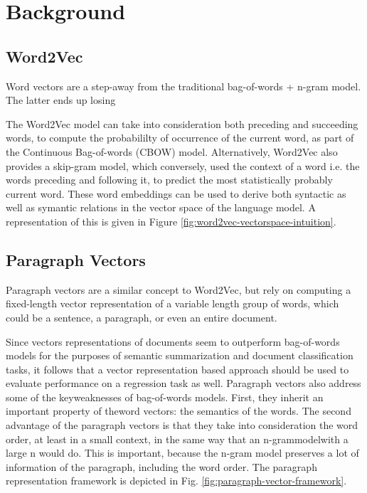 \documentclass[conference]{IEEEtran}
\begin{document}
\section{Background}

    \subsection{Word2Vec} \label{Word2Vec}
        Word vectors are a step-away from the traditional bag-of-words + n-gram model. The latter ends up losing

        The Word2Vec model\cite{mikolov2013efficient} can take into consideration both preceding and succeeding words, to compute the probabililty of occurrence of the current word, as part of the Continuous Bag-of-words (CBOW) model. Alternatively, Word2Vec also provides a skip-gram model\cite{mikolov2013distributed}, which conversely, used the context of a word i.e. the words preceding and following it, to predict the most statistically probably current word. These word embeddings can be used to derive both syntactic as well as symantic relations in the vector space of the language model. A representation of this is given in Figure \ref{fig:word2vec-vectorspace-intuition}.

    \subsection{Paragraph Vectors}
        Paragraph vectors are a similar concept to Word2Vec, but rely on computing a fixed-length vector representation of a variable length group of words, which could be a sentence, a paragraph, or even an entire document.

        Since vectors representations of documents seem to outperform bag-of-words models for the purposes of semantic summarization and document classification tasks, it follows that a vector representation based approach should be used to evaluate performance on a regression task as well. Paragraph vectors also address some of the keyweaknesses of bag-of-words models. First, they inherit an important property of theword vectors: the semantics of the words. The second advantage of the paragraph vectors is that they take into consideration the word order, at least in a small context, in the same way that an n-grammodelwith a large n would do. This is important, because the n-gram model preserves a lot of information of the paragraph, including the word order\cite{le2014distributed}. The paragraph representation framework is depicted in Fig. \ref{fig:paragraph-vector-framework}.
\end{document}
